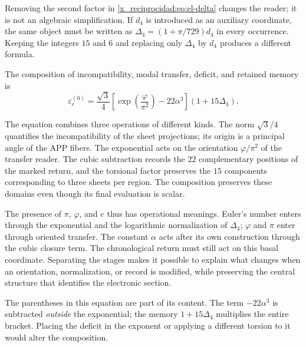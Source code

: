 \begin{remark}
Removing the second factor in \eqref{x_reciprocidad:eq:el-delta} changes the reader; it
is not an algebraic simplification. If \(d_4\) is introduced as an
auxiliary coordinate, the same object must be written as
\(\Delta_4=(1+\pi/729)d_4\) in every occurrence. Keeping the
integers \(15\) and \(6\) and replacing only \(\Delta_4\) by \(d_4\)
produces a different formula.
\end{remark}

\begin{definition}
The composition of incompatibility, modal transfer, deficit, and retained memory
is
\begin{equation}
 \varepsilon_e^{(0)}
 =\frac{\sqrt3}{4}
  \left[\exp\!\left(\frac{\varphi}{\pi^2}\right)-22\alpha^3\right]
  (1+15\Delta_4).
 \label{x_reciprocidad:eq:el-basal}
\end{equation}
\end{definition}

The equation combines three operations of different kinds. The norm
\(\sqrt3/4\) quantifies the incompatibility of the sheet
projections; its origin is a principal angle of the APP fibers.
The exponential acts on the orientation \(\varphi/\pi^2\) of the
transfer reader. The cubic subtraction records the \(22\) complementary
positions of the marked return, and the torsional factor preserves the
\(15\) components corresponding to three sheets per region. The
composition preserves these domains even though its final evaluation is scalar.

The presence of \(\pi\), \(\varphi\), and \(e\) thus has operational
meanings. Euler's number enters through the exponential and
the logarithmic normalization of \(\Delta_4\); \(\varphi\) and \(\pi\)
enter through oriented transfer. The constant \(\alpha\)
acts after its own construction through the cubic closure
term. The chronological return must still act on this basal
coordinate. Separating the stages makes it possible to explain what changes when
an orientation, normalization, or record is modified, while preserving the central
structure that identifies the electronic section.

The parentheses in this equation are part of its content. The term
\(-22\alpha^3\) is subtracted \emph{outside} the exponential; the memory
\(1+15\Delta_4\) multiplies the entire bracket. Placing the deficit in
the exponent or applying a different torsion to it would alter the composition.

